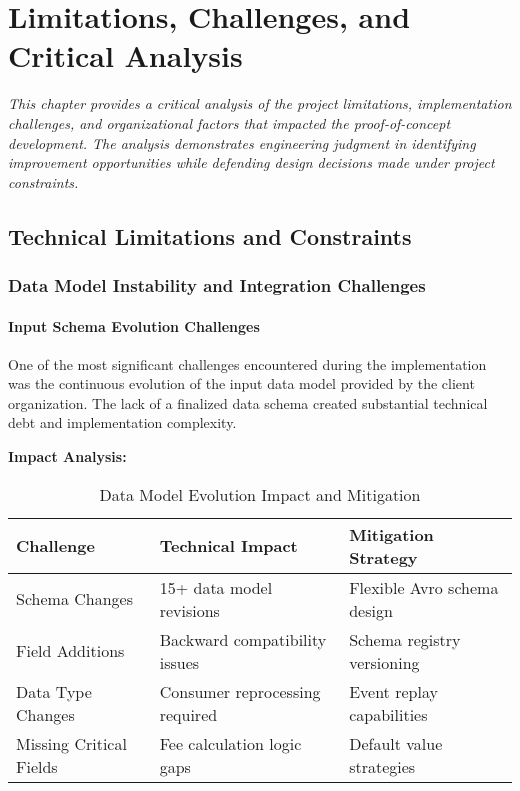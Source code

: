 \chapter{Limitations, Challenges, and Critical Analysis}
\textit{This chapter provides a critical analysis of the project limitations, implementation challenges, and organizational factors that impacted the proof-of-concept development. The analysis demonstrates engineering judgment in identifying improvement opportunities while defending design decisions made under project constraints.}
\pagebreak

\section{Technical Limitations and Constraints}

\subsection{Data Model Instability and Integration Challenges}

\subsubsection{Input Schema Evolution Challenges}

One of the most significant challenges encountered during the implementation was the continuous evolution of the input data model provided by the client organization. The lack of a finalized data schema created substantial technical debt and implementation complexity.

\textbf{Impact Analysis:}
\begin{table}[h]
\centering
\begin{tabular}{|l|l|l|}
\hline
\textbf{Challenge} & \textbf{Technical Impact} & \textbf{Mitigation Strategy} \\ 
\hline
Schema Changes & 15+ data model revisions & Flexible Avro schema design \\
Field Additions & Backward compatibility issues & Schema registry versioning \\
Data Type Changes & Consumer reprocessing required & Event replay capabilities \\
Missing Critical Fields & Fee calculation logic gaps & Default value strategies \\
\hline
\end{tabular}
\caption{Data Model Evolution Impact and Mitigation}
\end{table}

